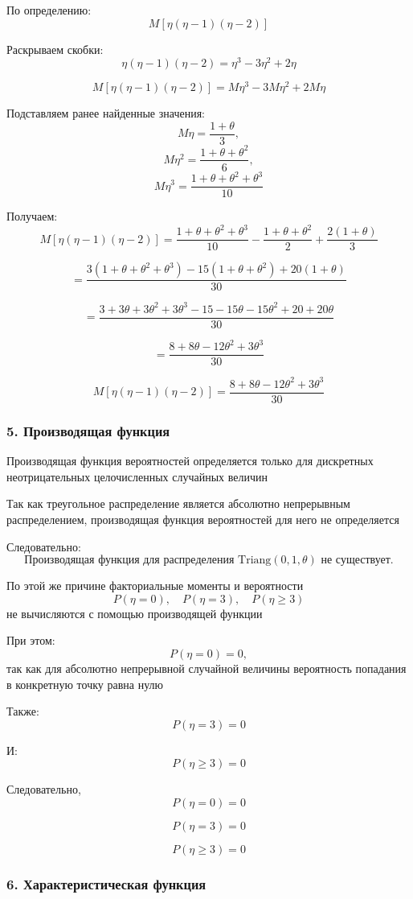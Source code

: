 \documentclass[12pt,a4paper]{article}
\theoremstyle{definition}
\begin{document}
По определению:
\[M[\eta(\eta-1)(\eta-2)]\]

Раскрываем скобки:
\[\eta(\eta-1)(\eta-2)=\eta^3-3\eta^2+2\eta\]

\[M[\eta(\eta-1)(\eta-2)]=M\eta^3-3M\eta^2+2M\eta\]

Подставляем ранее найденные значения:
\[M\eta=\frac{1+\theta}{3},\]
\[M\eta^2=\frac{1+\theta+\theta^2}{6},\]
\[M\eta^3=\frac{1+\theta+\theta^2+\theta^3}{10}\]

Получаем:
\[M[\eta(\eta-1)(\eta-2)]
=
\frac{1+\theta+\theta^2+\theta^3}{10}
-
\frac{1+\theta+\theta^2}{2}
+
\frac{2(1+\theta)}{3}\]

\[=
\frac{
3(1+\theta+\theta^2+\theta^3)
-15(1+\theta+\theta^2)
+20(1+\theta)
}{30}\]

\[=
\frac{
3+3\theta+3\theta^2+3\theta^3
-15-15\theta-15\theta^2
+20+20\theta
}{30}\]

\[=\frac{
8+8\theta-12\theta^2+3\theta^3
}{30}\]

\[
\boxed{M[\eta(\eta-1)(\eta-2)]=\frac{
8+8\theta-12\theta^2+3\theta^3
}{30}}\]

\subsubsection*{5. Производящая функция}

Производящая функция вероятностей определяется только для дискретных неотрицательных целочисленных случайных величин

Так как треугольное распределение является абсолютно непрерывным распределением, производящая функция вероятностей для него не определяется

Следовательно:
\[
\boxed{
\text{Производящая функция для распределения }
\mathrm{Triang}(0,1,\theta)
\text{ не существует.}
}
\]

По этой же причине факториальные моменты и вероятности
\[
P(\eta=0),
\quad
P(\eta=3),
\quad
P(\eta\ge3)
\]
не вычисляются с помощью производящей функции

При этом:
\[
P(\eta=0)=0,
\]
так как для абсолютно непрерывной случайной величины вероятность попадания в конкретную точку равна нулю

Также:
\[P(\eta=3)=0\]

И:
\[P(\eta\ge3)=0\]

Следовательно,
\[
\boxed{P(\eta=0)=0}\]

\[\boxed{P(\eta=3)=0}\]

\[\boxed{P(\eta\ge3)=0}\]

\subsubsection*{6. Характеристическая функция}
\end{document}

